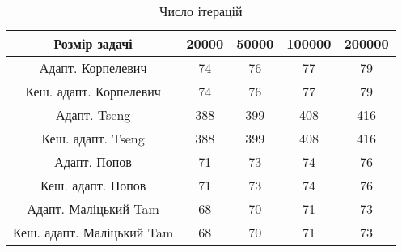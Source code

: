 \begin{table}[H]
	\centering
	\begin{tabular}{|c||c|c|c|c|}\hline
		Розмір задачі & 20000 & 50000 & 100000 & 200000 \\ \hline \hline
		Адапт. Корпелевич & 74 & 76 & 77 & 79 \\ \hline
		Кеш. адапт. Корпелевич & 74 & 76 & 77 & 79 \\ \hline
		Адапт. Tseng & 388 & 399 & 408 & 416 \\ \hline
		Кеш. адапт. Tseng & 388 & 399 & 408 & 416 \\ \hline
		Адапт. Попов & 71 & 73 & 74 & 76 \\ \hline
		Кеш. адапт. Попов & 71 & 73 & 74 & 76 \\ \hline
		Адапт. Маліцький Tam & 68 & 70 & 71 & 73 \\ \hline
		Кеш. адапт. Маліцький Tam & 68 & 70 & 71 & 73 \\ \hline
	\end{tabular}
	\caption{Число ітерацій}
\end{table}
